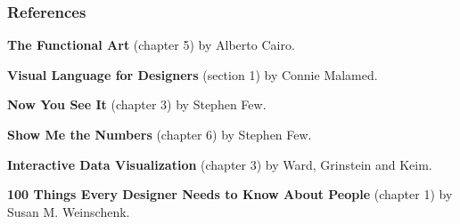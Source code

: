 \documentclass[12pt]{beamer}\usepackage[]{graphicx}\usepackage[]{color}
\begin{document}

\begin{frame}
\frametitle{References}

\bbi
  \item \textbf{The Functional Art} (chapter 5) by Alberto Cairo.
  \item \textbf{Visual Language for Designers} (section 1) by Connie Malamed.
  \item \textbf{Now You See It} (chapter 3) by Stephen Few.
  \item \textbf{Show Me the Numbers} (chapter 6) by Stephen Few.
  \item \textbf{Interactive Data Visualization} (chapter 3) by Ward, Grinstein
  and Keim.
  \item \textbf{100 Things Every Designer Needs to Know About People} 
  (chapter 1) by Susan M. Weinschenk.
\ei

\end{frame}

\end{document}
